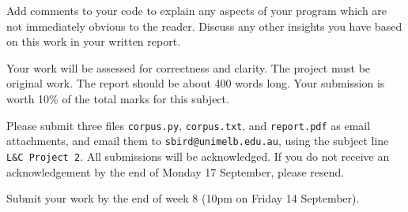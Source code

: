 \documentclass[a4paper]{article}
\begin{document}
Add comments to your code to explain any aspects of your
program which are not immediately obvious to the reader.
Discuss any other insights you have based on this work
in your written report.

Your work will be assessed for correctness and clarity.
The project must be original work.  The report should be about 400 words long.
Your submission is worth 10\% of the total marks for this subject.

Please submit three files \verb|corpus.py|, \verb|corpus.txt|, and \verb|report.pdf|
as email attachments, and email them to \texttt{sbird@unimelb.edu.au},
using the subject line \verb|L&C Project 2|.
All submissions will be acknowledged.  If you do not receive an acknowledgement by
the end of Monday 17 September, please resend.

Submit your work by the end of week 8 (10pm on Friday 14 September).
\end{document}
